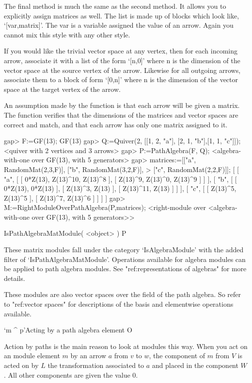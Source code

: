 The final method is much the same as the second method.  It allows 
you to explicitly assign matrices as well.  The list is made up of 
blocks which look like, `[var,matrix]'.  The var is a variable assigned 
the value of an arrow.  Again you cannot mix this style with any other 
style.  

If you would like the trivial vector space at any vertex, then for each
incoming arrow, associate it with a list of the form `[n,0]' where n is the
dimension of the vector space at the source vertex of the arrow.  Likewise for
all outgoing arrows, associate them to a block of form `[0,n]' where n is the 
dimension of the vector space at the target vertex of the arrow.

An assumption made by the function is that each arrow will be 
given a matrix.  The function verifies that the dimensions 
of the matrices and vector spaces are correct and match, 
and that each arrow has only one matrix assigned to it.  

\beginexample
gap> F:=GF(13);
GF(13)
gap> Q:=Quiver(2, [[1, 2, "a"], [2, 1, "b"],[1, 1, "c"]]); 
<quiver with 2 vertices and 3 arrows>
gap> P:=PathAlgebra(F, Q);
<algebra-with-one over GF(13), with 5 generators>
gap> matrices:=[["a", RandomMat(2,3,F)], ["b", RandomMat(3,2,F)],
> ["c", RandomMat(2,2,F)]];
[ [ "a", [ [ 0*Z(13), Z(13)^10, Z(13)^8 ], [ Z(13)^9, Z(13)^0, Z(13)^9 ] ] ],
  [ "b", [ [ 0*Z(13), 0*Z(13) ], [ Z(13)^3, Z(13) ], [ Z(13)^11, Z(13) ] ] ],
  [ "c", [ [ Z(13)^5, Z(13)^5 ], [ Z(13)^7, Z(13)^6 ] ] ] ]
gap> M:=RightModuleOverPathAlgebra(P,matrices);
<right-module over <algebra-with-one over GF(13), with 5 generators>>
\endexample


\>IsPathAlgebraMatModule( <object> ) P

These matrix modules fall under the category `IsAlgebraModule'
with the added filter of `IsPathAlgebraMatModule'.  
Operations available for algebra modules can be applied
to path algebra modules.
See "ref:representations of algebras" for more details.

These modules are also vector spaces over the field of the path algebra.
So refer to "ref:vector spaces" 
for descriptions of the basis and elementwise operations available.


\>`m ^ p'{Acting by a path algebra element} O

Action by paths is the main reason to look at modules this 
way.  When you act on an module element $m$ by an arrow $a$ from $v$ 
to $w$, the component of $m$ from $V$ is 
acted on by $L$ the transformation associated to $a$  and placed
in the component $W$ .  All other components are given the value
$0$.

